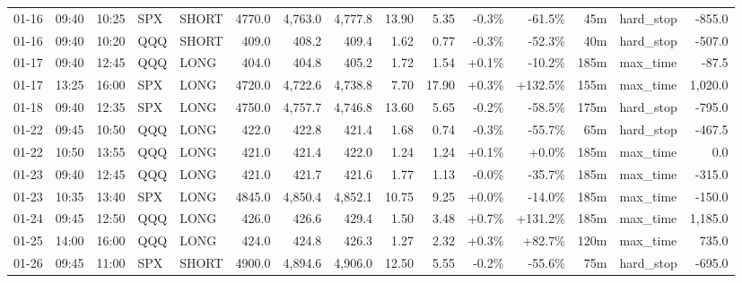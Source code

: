 \documentclass[11pt,a4paper,twoside]{article}
\begin{document}
\begin{landscape}
\begin{center}
\begin{longtable}{>{\color{txtmain}}l l l l l r r r r r r r r >{\color{txtmain}}l r}
01-16 & 09:40 & 10:25 & SPX & SHORT & 4770.0 & 4,763.0 & 4,777.8 & 13.90 & 5.35 & \textcolor{lossred}{-0.3\%} & \textcolor{lossred}{-61.5\%} & 45m & hard\_stop & \textcolor{lossred}{-855.0} \\
01-16 & 09:40 & 10:20 & QQQ & SHORT & 409.0 & 408.2 & 409.4 & 1.62 & 0.77 & \textcolor{lossred}{-0.3\%} & \textcolor{lossred}{-52.3\%} & 40m & hard\_stop & \textcolor{lossred}{-507.0} \\
01-17 & 09:40 & 12:45 & QQQ & LONG & 404.0 & 404.8 & 405.2 & 1.72 & 1.54 & \textcolor{wingreen}{+0.1\%} & \textcolor{lossred}{-10.2\%} & 185m & max\_time & \textcolor{lossred}{-87.5} \\
01-17 & 13:25 & 16:00 & SPX & LONG & 4720.0 & 4,722.6 & 4,738.8 & 7.70 & 17.90 & \textcolor{wingreen}{+0.3\%} & \textcolor{wingreen}{+132.5\%} & 155m & max\_time & \textcolor{wingreen}{1,020.0} \\
01-18 & 09:40 & 12:35 & SPX & LONG & 4750.0 & 4,757.7 & 4,746.8 & 13.60 & 5.65 & \textcolor{lossred}{-0.2\%} & \textcolor{lossred}{-58.5\%} & 175m & hard\_stop & \textcolor{lossred}{-795.0} \\
01-22 & 09:45 & 10:50 & QQQ & LONG & 422.0 & 422.8 & 421.4 & 1.68 & 0.74 & \textcolor{lossred}{-0.3\%} & \textcolor{lossred}{-55.7\%} & 65m & hard\_stop & \textcolor{lossred}{-467.5} \\
01-22 & 10:50 & 13:55 & QQQ & LONG & 421.0 & 421.4 & 422.0 & 1.24 & 1.24 & \textcolor{wingreen}{+0.1\%} & \textcolor{wingreen}{+0.0\%} & 185m & max\_time & \textcolor{wingreen}{0.0} \\
01-23 & 09:40 & 12:45 & QQQ & LONG & 421.0 & 421.7 & 421.6 & 1.77 & 1.13 & \textcolor{lossred}{-0.0\%} & \textcolor{lossred}{-35.7\%} & 185m & max\_time & \textcolor{lossred}{-315.0} \\
01-23 & 10:35 & 13:40 & SPX & LONG & 4845.0 & 4,850.4 & 4,852.1 & 10.75 & 9.25 & \textcolor{wingreen}{+0.0\%} & \textcolor{lossred}{-14.0\%} & 185m & max\_time & \textcolor{lossred}{-150.0} \\
01-24 & 09:45 & 12:50 & QQQ & LONG & 426.0 & 426.6 & 429.4 & 1.50 & 3.48 & \textcolor{wingreen}{+0.7\%} & \textcolor{wingreen}{+131.2\%} & 185m & max\_time & \textcolor{wingreen}{1,185.0} \\
01-25 & 14:00 & 16:00 & QQQ & LONG & 424.0 & 424.8 & 426.3 & 1.27 & 2.32 & \textcolor{wingreen}{+0.3\%} & \textcolor{wingreen}{+82.7\%} & 120m & max\_time & \textcolor{wingreen}{735.0} \\
01-26 & 09:45 & 11:00 & SPX & SHORT & 4900.0 & 4,894.6 & 4,906.0 & 12.50 & 5.55 & \textcolor{lossred}{-0.2\%} & \textcolor{lossred}{-55.6\%} & 75m & hard\_stop & \textcolor{lossred}{-695.0} \\

\end{longtable}
\end{center}
\end{landscape}
\end{document}

